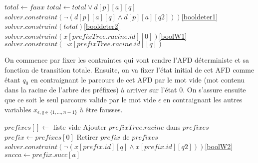 \documentclass[12pt,a4paper,oneside,titlepage]{report}
\begin{document}
\begin{algorithm}[H]
\begin{algorithmic}[1]
		\State $total\gets faux$
			\State $total\gets total\lor d[p][a][q]$
				\State $solver.constraint(\neg(d[p][a][q]\land d[p][a][q2]))$\Comment \ref{booldeter1}
			\EndFor
		\EndFor
		\State $solver.constraint(total)$\Comment \ref{booldeter2}
	\EndFor
\EndFor
\State $solver.constraint(x[prefixTree.racine.id][0])$\Comment \ref{boolW1}
	\State $solver.constraint(\neg x[prefixTree.racine.id][q])$
\EndFor
{}
\end{algorithmic}
\end{algorithm}
\noindent On commence par fixer les contraintes qui vont rendre l'AFD déterministe et sa fonction de transition totale. Ensuite, on va fixer l'état initial de cet AFD comme étant $q_0$ en contraignant le parcours de cet AFD par le mot vide (mot contenu dans la racine de l'arbre des préfixes) à arriver sur l'état $0$. On s'assure ensuite que ce soit le seul parcours valide par le mot vide $\epsilon$ en contraignant les autres variables $x_{\epsilon,q\in\{1,...,n-1\}}$ à être fausses.

\begin{algorithm}[H]
\begin{algorithmic}[1]
\State $prefixes[]\gets$ liste vide
\State Ajouter $prefixTree.racine$ dans $prefixes$
	\State $prefix\gets prefixes[0]$
	\State Retirer $prefix$ de $prefixes$
			\State $solver.constraint(\neg(x[prefix.id][q]\land x[prefix.id][q2]))$\Comment \ref{boolW2}
		\EndFor
	\EndFor
			\State $succa\gets prefix.succ[a]$
\end{algorithmic}
\end{algorithm}
\end{document}
